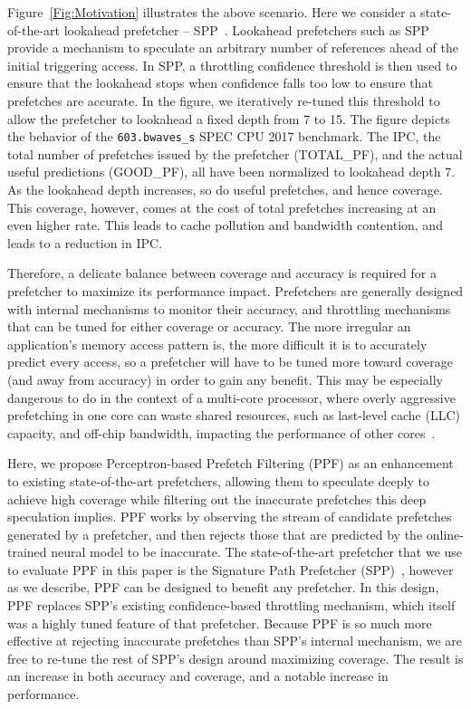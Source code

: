 Figure~\ref{Fig:Motivation} illustrates the above scenario.  Here we
consider a state-of-the-art lookahead prefetcher -- SPP~\cite{SPP}.
Lookahead prefetchers such as SPP provide a mechanism to speculate an
arbitrary number of references ahead of the initial triggering access.
In SPP, a throttling confidence threshold is then used to ensure that
the lookahead stops when confidence falls too low to ensure that
prefetches are accurate.  In the figure, we iteratively re-tuned 
this threshold to allow the prefetcher to lookahead a fixed
depth from 7 to 15. The figure depicts the behavior 
of the {\tt 603.bwaves\_s} SPEC CPU 2017 benchmark. The IPC, the 
total number of prefetches issued by the prefetcher (TOTAL\_PF), 
and the actual useful predictions (GOOD\_PF), all have been normalized 
to lookahead depth 7. As the lookahead
depth increases, so do useful prefetches, and hence coverage. This
coverage, however, comes at the cost of total prefetches increasing at
an even higher rate. This leads to cache pollution and bandwidth
contention, and leads to a reduction in IPC.  

Therefore, a delicate balance between coverage and accuracy is
required for a prefetcher to maximize its performance impact.
Prefetchers are generally designed with internal mechanisms to monitor
their accuracy, and throttling mechanisms that can be tuned for either
coverage or accuracy.  The more irregular an application's memory
access pattern is, the more difficult it is to accurately predict
every access, so a prefetcher will have to be tuned more toward
coverage (and away from accuracy) in order to gain any benefit. This
may be especially dangerous to do in the context of a multi-core
processor, where overly aggressive prefetching in one core can waste
shared resources, such as last-level cache (LLC) capacity, and
off-chip bandwidth, impacting the performance of other
cores~\cite{Friendly}.


Here, we propose Perceptron-based Prefetch Filtering (PPF) as an
enhancement to existing state-of-the-art prefetchers, allowing them to
speculate deeply to achieve high coverage while filtering out the
inaccurate prefetches this deep speculation implies.  PPF works by
observing the stream of candidate prefetches generated by a
prefetcher, and then rejects those that are predicted by the
online-trained neural model to be inaccurate.  The state-of-the-art
prefetcher that we use to evaluate PPF in this paper is the Signature
Path Prefetcher (SPP)~\cite{SPP}, however as we describe, PPF can be
designed to benefit any prefetcher.  In this design, PPF replaces
SPP's existing confidence-based throttling mechanism, which itself was
a highly tuned feature of that prefetcher.  Because PPF is so much
more effective at rejecting inaccurate prefetches than SPP's 
{internal} mechanism, we are free to re-tune the rest of 
SPP's design around maximizing coverage. The result is an increase 
in both accuracy and coverage, and a notable increase in performance.


